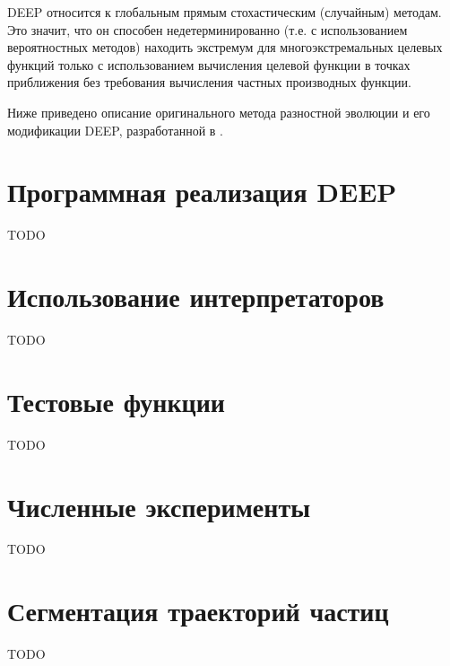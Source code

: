 DEEP относится к глобальным прямым стохастическим (случайным) методам.
Это значит, что он способен недетерминированно (т.е. с использованием вероятностных методов) находить экстремум для многоэкстремальных целевых функций только с использованием вычисления целевой функции в точках приближения без требования вычисления частных производных функции.

Ниже приведено описание оригинального метода разностной эволюции и его модификации DEEP, разработанной в \cite{KozlovThesis}.

\section*{Программная реализация DEEP}
TODO

\section*{Использование интерпретаторов}
TODO

\section*{Тестовые функции}
TODO

\section*{Численные эксперименты}
TODO

\section*{Сегментация траекторий частиц}
TODO

